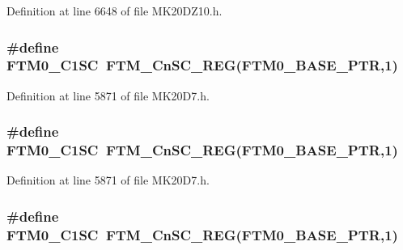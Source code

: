 Definition at line 6648 of file M\+K20\+D\+Z10.\+h.

\subsubsection[{\texorpdfstring{F\+T\+M0\+\_\+\+C1\+SC}{FTM0_C1SC}}]{\setlength{\rightskip}{0pt plus 5cm}\#define F\+T\+M0\+\_\+\+C1\+SC~{\bf F\+T\+M\+\_\+\+Cn\+S\+C\+\_\+\+R\+EG}({\bf F\+T\+M0\+\_\+\+B\+A\+S\+E\+\_\+\+P\+TR},1)}\hypertarget{group___f_t_m___register___accessor___macros_gaee6e9112813556e6ecd3ff15ac3679db}{}\label{group___f_t_m___register___accessor___macros_gaee6e9112813556e6ecd3ff15ac3679db}


Definition at line 5871 of file M\+K20\+D7.\+h.

\subsubsection[{\texorpdfstring{F\+T\+M0\+\_\+\+C1\+SC}{FTM0_C1SC}}]{\setlength{\rightskip}{0pt plus 5cm}\#define F\+T\+M0\+\_\+\+C1\+SC~{\bf F\+T\+M\+\_\+\+Cn\+S\+C\+\_\+\+R\+EG}({\bf F\+T\+M0\+\_\+\+B\+A\+S\+E\+\_\+\+P\+TR},1)}\hypertarget{group___f_t_m___register___accessor___macros_gaee6e9112813556e6ecd3ff15ac3679db}{}\label{group___f_t_m___register___accessor___macros_gaee6e9112813556e6ecd3ff15ac3679db}


Definition at line 5871 of file M\+K20\+D7.\+h.

\subsubsection[{\texorpdfstring{F\+T\+M0\+\_\+\+C1\+SC}{FTM0_C1SC}}]{\setlength{\rightskip}{0pt plus 5cm}\#define F\+T\+M0\+\_\+\+C1\+SC~{\bf F\+T\+M\+\_\+\+Cn\+S\+C\+\_\+\+R\+EG}({\bf F\+T\+M0\+\_\+\+B\+A\+S\+E\+\_\+\+P\+TR},1)}\hypertarget{group___f_t_m___register___accessor___macros_gaee6e9112813556e6ecd3ff15ac3679db}{}\label{group___f_t_m___register___accessor___macros_gaee6e9112813556e6ecd3ff15ac3679db}


